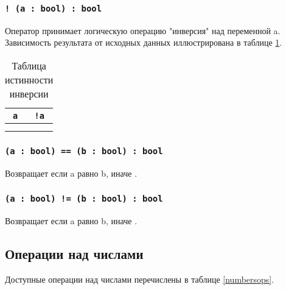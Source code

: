 \subsubsection{\texttt{! (a : bool) : bool}}

Оператор принимает логическую операцию "инверсия" над переменной a. Зависимость результата от исходных данных иллюстрирована в таблице \ref{invtable}.

\begin{table}[htb]
	\caption{Таблица истинности инверсии}
	\label{invtable}
	\begin{tabular}{|c|c|}
		\hline
		\texttt{a} & \texttt{!a} \\ \hline
		\false{} & \true{} 	 \\ \hline
		\true{}  & \false{}  \\ \hline
	\end{tabular}
	\vspace{-2em}
\end{table}

\subsubsection{\texttt{(a : bool) == (b : bool) : bool}}

Возвращает \true{} если a равно b, иначе \false{}.

\subsubsection{\texttt{(a : bool) != (b : bool) : bool}}

Возвращает \true{} если a равно b, иначе \false{}.

\subsection{Операции над числами}

Доступные операции над числами перечислены в таблице \ref{numbersops}.

